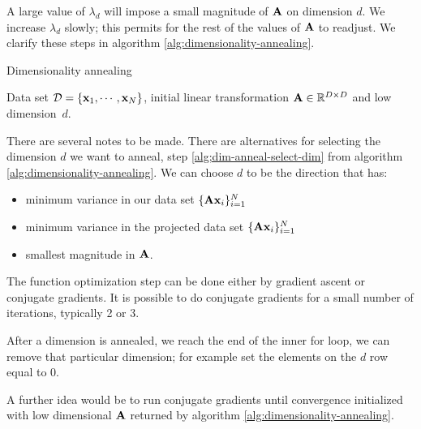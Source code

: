   A large value of $\lambda_d$ will impose a small magnitude of $\mathbf{A}$ on dimension $d$. We increase $\lambda_d$ slowly; this permits for the rest of the values of $\mathbf{A}$ to readjust. We clarify these steps in algorithm \ref{alg:dimensionality-annealing}.

  \begin{algorithm} 
	\caption{Dimensionality annealing} 
	\label{alg:dimensionality-annealing}  
	\begin{algorithmic} [1]                 %
		\REQUIRE Data set $\mathcal{D}=\{\mathbf{x}_1,\cdots,\mathbf{x}_N\}$, initial linear
transformation $\mathbf{A}\in\mathbb{R}^{D\times D}$ and low dimension~$d$.
		   \label{alg:dim-anneal-select-dim}
		  \ENDFOR
		\ENDFOR
	\end{algorithmic}
\end{algorithm}

  There are several notes to be made. There are alternatives for selecting the dimension $d$ we want to anneal, step \ref{alg;dim-anneal-select-dim} from algorithm \ref{alg:dimensionality-annealing}. We can choose $d$ to be the direction that has:
    \begin{itemize}
     \item minimum variance in our data set $\{\mathbf{A}\mathbf{x}_i\}_{i=1}^N$
     \item minimum variance in the projected data set $\{\mathbf{A}\mathbf{x}_i\}_{i=1}^N$
     \item smallest magnitude in $\mathbf{A}$.
    \end{itemize}

    The function optimization step can be done either by gradient ascent or conjugate gradients. It is possible to do conjugate gradients for a small number of iterations, typically 2 or 3.

    After a dimension is annealed, we reach the end of the inner for loop, we can remove that particular dimension; for example set the elements on the $d$ row equal to 0.

    A further idea would be to run conjugate gradients until convergence initialized with low dimensional $\mathbf{A}$ returned by algorithm \ref{alg:dimensionality-annealing}.
